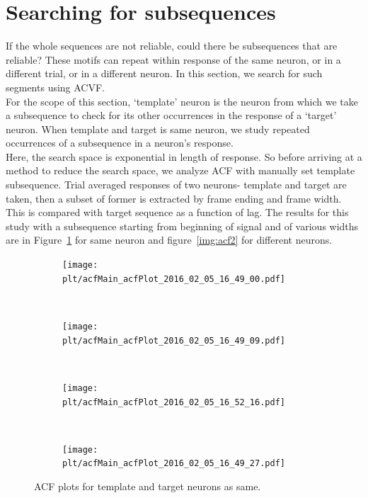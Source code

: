\documentclass[11pt]{article}
\newcommand{\plt}{../../plots}
\begin{document}
\section{Searching for subsequences} %
\label{sec:searching_for_motifs}
If the whole sequences are not reliable, could there be subsequences that are reliable? These motifs can repeat within response of the same neuron, or in a different trial, or in a different neuron. In this section, we search for such segments using ACVF.\\
For the scope of this section, `template' neuron is the neuron from which we take a subsequence to check for its other occurrences in the response of a `target' neuron.
When template and target is same neuron, we study repeated occurrences of a subsequence in a neuron's response.\\
Here, the search space is exponential in length of response. So before arriving at a method to reduce the search space, we analyze ACF with manually set template subsequence. Trial averaged responses of two neurons- template and target are taken, then a subset of former is extracted by frame ending and frame width. This is compared with target sequence as a function of lag. The results for this study with a subsequence starting from beginning of signal and of various widths are in Figure~\ref{img:acf1} for same neuron and figure~\ref{img:acf2} for different neurons.

\begin{figure}
    \centering
    \begin{subfigure}[b]{.48\textwidth}
        \centering
        \texttt{[image: \\plt/acfMain\_acfPlot\_2016\_02\_05\_16\_49\_00.pdf]}
    \end{subfigure}
    ~
    \begin{subfigure}[b]{.48\textwidth}
        \centering
        \texttt{[image: \\plt/acfMain\_acfPlot\_2016\_02\_05\_16\_49\_09.pdf]}
    \end{subfigure}
    \\
    \begin{subfigure}[b]{.48\textwidth}
        \centering
        \texttt{[image: \\plt/acfMain\_acfPlot\_2016\_02\_05\_16\_52\_16.pdf]}
    \end{subfigure}
    ~
    \begin{subfigure}[b]{.48\textwidth}
        \centering
        \texttt{[image: \\plt/acfMain\_acfPlot\_2016\_02\_05\_16\_49\_27.pdf]}
    \end{subfigure}
    \caption{ACF plots for template and target neurons as same.}
    \label{img:acf1}
\end{figure}
\end{document}
